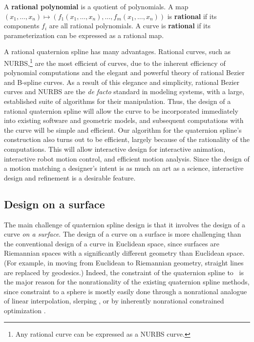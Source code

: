 \begin{defn2}
A {\bf rational polynomial} is a quotient of polynomials.
A map $(x_1,\ldots,x_n) \mapsto (f_1 (x_1,\ldots,x_n),\ldots,f_m (x_1,\ldots,x_n))$
is {\bf rational} if 
its components $f_i$ are all rational polynomials.
A curve is {\bf rational} if its parameterization can be 
expressed as a rational map.
\end{defn2}

A rational quaternion spline has many advantages.
Rational curves, such as NURBS,\footnote{Any rational curve can be expressed
	as a NURBS curve.}
are the most efficient of curves,
due to the inherent efficiency of polynomial computations and 
the elegant and powerful theory of rational Bezier and B-spline curves.
As a result of this elegance and simplicity, 
rational Bezier curves and NURBS are the {\em de facto} standard 
in modeling systems, with a large, established suite of algorithms for their 
manipulation.
Thus, the design of a rational quaternion spline will allow the 
curve to be incorporated immediately into existing software and 
geometric models, 
and subsequent computations with the curve will be simple and efficient.
Our algorithm for the quaternion spline's construction also turns out to be
efficient, largely because of the rationality of the computations.
This will allow interactive design for interactive animation, 
interactive robot motion control, and efficient motion analysis.
Since the design of a motion matching a designer's intent 
is as much an art as a science,
interactive design and refinement is a desirable feature.

\subsection{Design on a surface}

The main challenge of quaternion spline design is that it involves the design of
a curve {\em on a surface}.
The design of a curve on a surface is more challenging than the conventional
design of a curve in Euclidean space, since surfaces are Riemannian spaces
with a significantly different geometry than Euclidean space.
(For example, in moving from Euclidean to Riemannian geometry, 
straight lines are replaced by geodesics.)
Indeed, the constraint of the quaternion spline to \ is the major 
reason for the nonrationality of the existing quaternion spline methods, 
since constraint to a sphere is mostly easily
done through a nonrational analogue of linear interpolation, slerping
\cite{shoemake85,duff85,pletinckx89,schlag91,nielson92,nielson93,kim95,nam95},
or by inherently nonrational constrained optimization \cite{barr92,rama97}.

